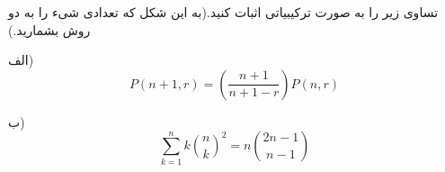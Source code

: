 \EXERCISE
تساوی زیر را به صورت ترکیبیاتی اثبات کنید.(به این شکل که تعدادی شیء را به دو روش بشمارید.)

الف)
$$P(n+1, r) = (\frac{n+1}{n+1-r})P(n, r)$$

ب)
$$\sum_{k=1}^{n}k\binom n k ^2 = n\binom{2n-1}{n-1}$$